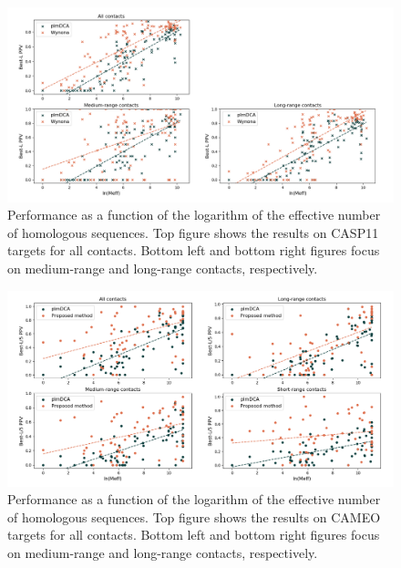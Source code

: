     \begin{figure}[H]
        \begin{center}
            \includegraphics[width=\textwidth, keepaspectratio]{imgs/Meff.png}
            \caption{Performance as a function of the logarithm of the effective
            number of homologous sequences. Top figure shows the results on
            CASP11 targets for all contacts. Bottom left and bottom right figures
            focus on medium-range and long-range contacts, respectively.}
            \label{sensitivity}
        \end{center}
    \end{figure}

    \begin{figure}[H]
        \begin{center}
            \includegraphics[width=\textwidth, keepaspectratio]{imgs/Meff_cameo.png}
            \caption{Performance as a function of the logarithm of the effective
            number of homologous sequences. Top figure shows the results on
            CAMEO targets for all contacts. Bottom left and bottom right figures
            focus on medium-range and long-range contacts, respectively.}
            \label{sensitivity}
        \end{center}
    \end{figure}
